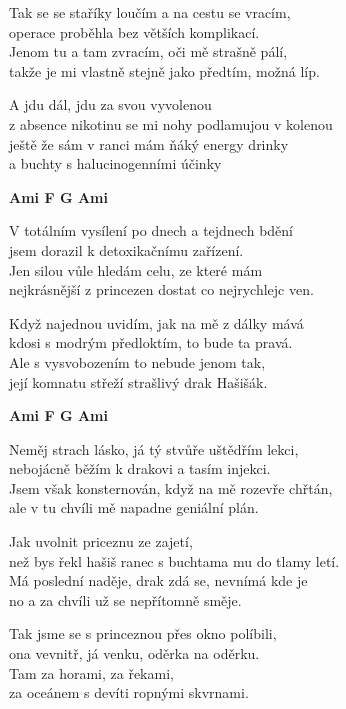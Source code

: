 \ve{}
Tak se se staříky loučím a na cestu se vracím,\\
operace proběhla bez větších komplikací.\\
Jenom tu a tam zvracím, oči mě strašně pálí,\\
takže je mi vlastně stejně jako předtím, možná líp.

\cho{}
A jdu dál, jdu za svou vyvolenou\\
z absence nikotinu se mi nohy podlamujou v kolenou\\
ještě že sám v ranci mám ňáký energy drinky\\
a buchty s halucinogenními účinky 

\begin{footnotesize}
\textbf{Ami F G Ami}
\end{footnotesize}

\ve{}
V totálním vysílení po dnech a tejdnech bdění\\
jsem dorazil k detoxikačnímu zařízení.\\
Jen silou vůle hledám celu, ze které mám\\
nejkrásnější z princezen dostat co nejrychlejc ven.

\ve{}
Když najednou uvidím, jak na mě z dálky mává\\
kdosi s modrým předloktím, to bude ta pravá.\\
Ale s vysvobozením to nebude jenom tak,\\
její komnatu střeží strašlivý drak Hašišák.

\begin{footnotesize}
\textbf{Ami F G Ami}
\end{footnotesize}

\ve{}
Neměj strach lásko, já tý stvůře uštědřím lekci,\\
nebojácně běžím k drakovi a tasím injekci.\\
Jsem však konsternován, když na mě rozevře chřtán,\\
ale v tu chvíli mě napadne geniální plán.

\cho{}
Jak uvolnit priceznu ze zajetí,\\
než bys řekl hašiš ranec s buchtama mu do tlamy letí.\\
Má poslední naděje, drak zdá se, nevnímá kde je\\
no a za chvíli už se nepřítomně směje.

\ve{}
Tak jsme se s princeznou přes okno políbili,\\
ona vevnitř, já venku, oděrka na oděrku.\\
Tam za horami, za řekami,\\
za oceánem s devíti ropnými skvrnami.
\esong